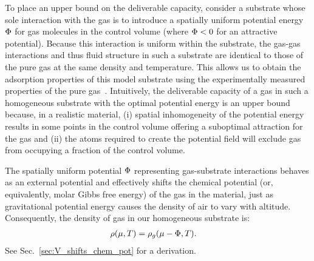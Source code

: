 To place an upper bound on the deliverable capacity, consider a substrate whose sole interaction with the gas is to introduce a spatially uniform potential energy $\Phi$
for gas molecules in the control volume (where $\Phi<0$ for an attractive potential). Because this interaction is uniform within the substrate, the gas-gas interactions and thus fluid structure in such a substrate are identical to those of the pure gas at the same density and temperature. This allows us to obtain the adsorption properties of this model substrate using the experimentally measured properties of the pure gas~\cite{nist}. 
Intuitively, the deliverable capacity of a gas in such a homogeneous substrate with the optimal potential energy is an upper bound because, in a realistic material, (i) spatial inhomogeneity of the potential energy results in some points in the control volume offering a suboptimal attraction for the gas and (ii) the atoms required to create the potential field will exclude gas from occupying a fraction of the control volume.




The spatially uniform potential $\Phi$ representing gas-substrate interactions behaves as an external potential and effectively shifts the chemical potential (or, equivalently, molar Gibbs free energy) of the gas in the material, just as gravitational potential energy causes the density of air to vary with altitude.  Consequently, the density of gas in our homogeneous substrate is:
\begin{align}
    \rho(\mu,T) &= \rho_g(\mu - \Phi,T). \label{eq:mof-density}
\end{align}
See Sec.~\ref{sec:V_shifts_chem_pot} for a derivation.

